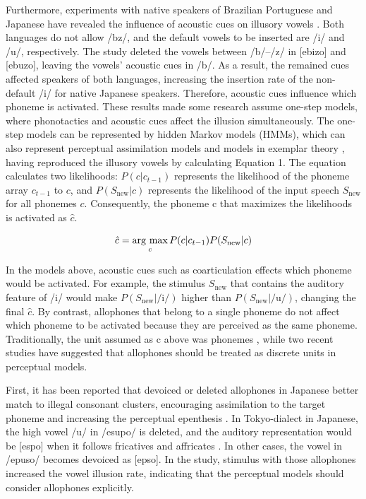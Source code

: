 \documentclass[a4paper,11pt,twocolumn]{article}
\newcommand{\argmax}{\mathop{\rm arg~max}\limits}
\begin{document}
Furthermore, experiments with native speakers of Brazilian Portuguese and Japanese have revealed the influence of acoustic cues on illusory vowels \cite{dupoux2011illusory}. Both languages do not allow /bz/, and the default vowels to be inserted are /i/ and /u/, respectively. The study deleted the vowels between /b/--/z/ in [ebizo] and [ebuzo], leaving the vowels' acoustic cues in /b/. As a result, the remained cues affected speakers of both languages, increasing the insertion rate of the non-default /i/ for native Japanese speakers. Therefore, acoustic cues influence which phoneme is activated.
These results made some research assume one-step models, where phonotactics and acoustic cues affect the illusion simultaneously. The one-step models can be represented by hidden Markov models (HMMs), which can also represent perceptual assimilation models \cite{best2001discrimination} and models in exemplar theory \cite{lacerda1995perceptual}, having reproduced the illusory vowels \cite{kishiyama2021influence} by calculating Equation 1. The equation calculates two likelihoods: $P(c|c_{t-1})$ represents the likelihood of the phoneme array $c_{t-1}$ to $c$, and $P(S_{\text{new}}|c)$ represents the likelihood of the input speech $S_{\text{new}}$ for all phonemes $c$. Consequently, the phoneme c that maximizes the likelihoods is activated as $\hat{c}$.

\begin{equation} \label{hmm}
    \hat{c} = \argmax_{c} P(c | c_{t-1})P(S_{\text{new}}|c)
\end{equation}

In the models above, acoustic cues such as coarticulation effects which phoneme would be activated. For example, the stimulus $S_{\text{new}}$ that contains the auditory feature of /i/ would make $P(S_{\text{new}}|\text{/i/})$ higher than $P(S_{\text{new}}|\text{/u/})$, changing the final $\hat{c}$. By contrast, allophones that belong to a single phoneme do not affect which phoneme to be activated because they are perceived as the same phoneme. Traditionally, the unit assumed as c above was phonemes \cite{wilson2013bayesian}, while two recent studies have suggested that allophones should be treated as discrete units in perceptual models.

First, it has been reported that devoiced or deleted allophones in Japanese better match to illegal consonant clusters, encouraging assimilation to the target phoneme and increasing the perceptual epenthesis \cite{kilpatrick2018japanese}. In Tokyo-dialect in Japanese, the high vowel /u/ in /esupo/ is deleted, and the auditory representation would be [espo] when it follows fricatives and affricates \cite{fujimoto2003devoice_eng, shaw2018lingual}. In other cases, the vowel in /epuso/ becomes devoiced as [ep\textsubring{\textturnm}so]. In the study, stimulus with those allophones increased the vowel illusion rate, indicating that the perceptual models should consider allophones explicitly. 
\end{document}
